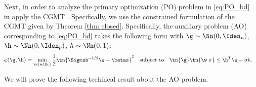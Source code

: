 Next, in order to analyze the primary optimization (PO) problem in \eqref{eq:PO_bd} in apply the CGMT \cite{thrampoulidis2015regularized,thrampoulidis2018precise}. Specifically, we use the constrained formulation of the CGMT given by Theorem \ref{thm closed}.  Specifically, the auxiliary problem (AO) corresponding to \eqref{eq:PO_bd} takes the following form with $\g\sim\Nn(0,\Iden_n)$, $\h\sim\Nn(0,\Iden_p)$, $h\sim \Nn(0,1)$:%
\begin{align}
\phi(\g,\h) = \min_{\w{\in\Bc}} \frac{1}{2}\tn{\Sigmab^{-1/2}\w+\betas}^2\quad\text{subject to}\quad \tn{\g}\tn{\w~{\sigma}}\leq \h^T\w+\sigma h.\label{eq:AO_con}
\end{align}%

We will prove the following techincal result about the AO problem.
